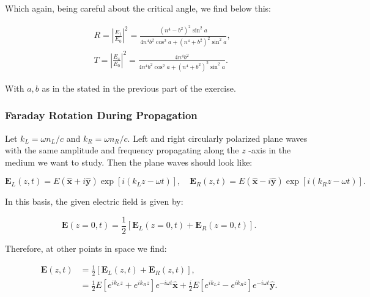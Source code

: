 Which again, being careful about the critical angle, we find below this:

\begin{equation}
	\begin{split}
		&R=\left|\frac{E_{1}}{E_{0}}\right|^{2}=\frac{\left(n^{4}-b^{2}\right)^{2} \sin ^{2} a}{4 n^{4} b^{2} \cos ^{2} a+\left(n^{4}+b^{2}\right)^{2} \sin ^{2} a}, \\
		&T=\left|\frac{E_{4}}{E_{0}}\right|^{2}=\frac{4 n^{4} b^{2}}{4 n^{4} b^{2} \cos ^{2} a+\left(n^{4}+b^{2}\right)^{2} \sin ^{2} a}.
	\end{split}
\end{equation}

With $a,b$ as in the stated in the previous part of the exercise.

\subsubsection{Faraday Rotation During Propagation}\label{Faraday Rotation During Propagation}

Let $k_{L}=\omega n_{L} / c$ and $k_{R}=\omega n_{R} / c .$ Left and right circularly polarized plane waves with the same amplitude and frequency propagating along the $z$ -axis in the medium we want to study. Then the plane waves should look like:

\begin{equation}
	\mathbf{E}_{L}(z, t)=E(\hat{\mathbf{x}}+i \hat{\mathbf{y}}) \exp \left[i\left(k_{L} z-\omega t\right)\right], \quad \mathbf{E}_{R}(z, t)=E(\hat{\mathbf{x}}-i \hat{\mathbf{y}}) \exp \left[i\left(k_{R} z-\omega t\right)\right].
\end{equation}

In this basis, the given electric field is given by:

\begin{equation}
	\mathbf{E}(z=0, t)=\frac{1}{2}\left[\mathbf{E}_{L}(z=0, t)+\mathbf{E}_{R}(z=0, t)\right].
\end{equation}

Therefore, at other points in space we find:

\begin{equation}
	\begin{split}
		\mathbf{E}(z, t) &=\frac{1}{2}\left[\mathbf{E}_{L}(z, t)+\mathbf{E}_{R}(z, t)\right], \\
		&=\frac{1}{2} E\left[e^{i k_{L} z}+e^{i k_{R} z}\right] e^{-i \omega t} \hat{\mathbf{x}}+\frac{i}{2} E\left[e^{i k_{L} z}-e^{i k_{R} z}\right] e^{-i \omega t} \hat{\mathbf{y}}.
	\end{split}
\end{equation}

